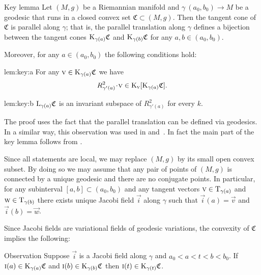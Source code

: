 \documentclass[a4paper,10pt]{article}
\begin{document}
\begin{thm}{Key lemma}\label{lem:key}
Let $(M,g)$ be a Riemannian manifold and $\gamma\:(a_0,b_0)\to M$ be a geodesic that runs in a closed convex set $\mathfrak{C}\subset (M,g)$.
Then the tangent cone of $\mathfrak{C}$ is parallel along $\gamma$; that is, the parallel translation along $\gamma$ defines a bijection between the tangent cones $\mathrm{K}_{\gamma(a)}\mathfrak{C}$ and $\mathrm{K}_{\gamma(b)}\mathfrak{C}$ for any $a,b \in (a_0,b_0)$.

Moreover, for any $a\in (a_0,b_0)$ the following conditions  hold:
\begin{subthm}{lem:key:a}
For any $\text{\sc{v}}\in \mathrm{K}_{\gamma(a)}\mathfrak{C}$ we have
\[R^2_{\gamma'(a)}\cdot \vec{v}\in \K_\vec{v}[\K_{\gamma(a)}\mathfrak{C}].\]
\end{subthm}

\begin{subthm}{lem:key:b} 
$\mathrm{L}_{\gamma(a)}\mathfrak{C}$ is an invariant subspace of $R^2_{\gamma'(a)}$ for every $k$.
\end{subthm}

\end{thm}

The proof uses the fact that the parallel translation can be defined via geodesics.
In a similar way, this observation was used in \cite[Section 13]{Ber-Nik} and~\cite{Petruninpar}.
In fact the main part of the key lemma follows from
\cite{Petruninpar}.

Since all statements are local, we may replace $(M,g)$ by its small open convex subset.
By doing so we may assume that any pair of points of $(M,g)$ is connected by a unique geodesic and there are no conjugate points.
In particular, for any subinterval $[a,b]\subset (a_0,b_0)$ and any tangent vectors $\text{\sc{v}} \in \mathrm{T}_{\gamma (a)}$ and $\text{\sc{w}} \in \mathrm{T}_{\gamma (b)}$ there exists unique Jacobi field $\vec i$ along $\gamma$ 
such that $\vec i(a)=\vec{v}$ and $\vec i(b)=\vec{w}$.

Since Jacobi fields are variational fields of geodesic variations, 
the convexity of $\mathfrak{C}$ implies the following: 

\begin{thm}{Observation}
Suppose $\vec i$ is a Jacobi field along %
$\gamma$ and $a_0<a<t<b<b_0$.
If 
$\text{\sc{i}}(a)\in \mathrm{K}_{\gamma(a)}\mathfrak{C}$ and $\text{\sc{i}}(b)\in \mathrm{K}_{\gamma(b)}\mathfrak{C}$
then $\text{\sc{i}}(t)\in \mathrm{K}_{\gamma(t)}\mathfrak{C}$.
\end{thm}%
\end{document}
